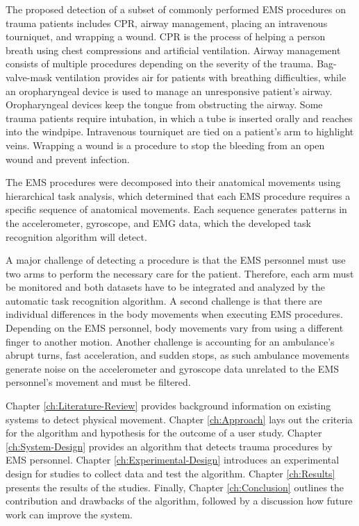 \par The proposed detection of a subset of commonly performed EMS procedures on trauma patients includes \gls{CPR}, airway management, placing an intravenous tourniquet, and wrapping a wound. CPR is the process of helping a person breath using chest compressions and artificial ventilation. Airway management consists of multiple procedures depending on the severity of the trauma. Bag-valve-mask ventilation provides air for patients with breathing difficulties, while an oropharyngeal device is used to manage an unresponsive patient's airway. Oropharyngeal devices keep the tongue from obstructing the airway. Some trauma patients require intubation, in which a tube is inserted orally and reaches into the windpipe. Intravenous tourniquet are tied on a patient's arm to highlight veins. Wrapping a wound is a procedure to stop the bleeding from an open wound and prevent infection.
\par The EMS procedures were decomposed into their anatomical movements using hierarchical task analysis, which determined that each EMS procedure requires a specific sequence of anatomical movements. Each sequence generates patterns in the accelerometer, gyroscope, and EMG data, which the developed task recognition algorithm will detect.
\par A major challenge of detecting a procedure is that the EMS personnel must use two arms to perform the necessary care for the patient. Therefore, each arm must be monitored and both datasets have to be integrated and analyzed by the automatic task recognition algorithm. A second challenge is that there are individual differences in the body movements when executing EMS procedures. Depending on the EMS personnel, body movements vary from using a different finger to another motion. Another challenge is accounting for an ambulance's abrupt turns, fast acceleration, and sudden stops, as such ambulance movements generate noise on the accelerometer and gyroscope data unrelated to the EMS personnel's movement and must be filtered.
\par Chapter \ref{ch:Literature-Review} provides background information on existing systems to detect physical movement. Chapter \ref{ch:Approach} lays out the criteria for the algorithm and hypothesis for the outcome of a user study. Chapter \ref{ch:System-Design} provides an algorithm that detects trauma procedures by \gls{EMS} personnel. Chapter \ref{ch:Experimental-Design} introduces an experimental design for studies to collect data and test the algorithm. Chapter \ref{ch:Results} presents the results of the studies. Finally, Chapter \ref{ch:Conclusion} outlines the contribution and drawbacks of the algorithm, followed by a discussion how future work can improve the system. 